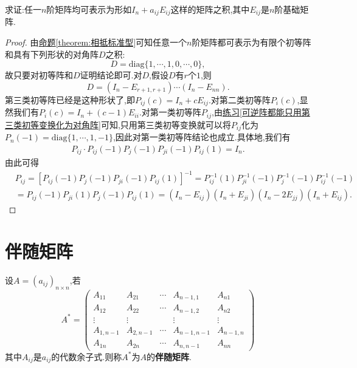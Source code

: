 \documentclass[lang=cn,newtx,10pt,scheme=chinese]{elegantbook}
\begin{document}
\begin{exercise}
求证:任一\(n\)阶矩阵均可表示为形如\(I_n + a_{ij}E_{ij}\)这样的矩阵之积,其中\(E_{ij}\)是\(n\)阶基础矩阵.
\end{exercise}
\begin{proof}
由\hyperref[theorem:相抵标准型]{命题\ref{theorem:相抵标准型}}可知任意一个\(n\)阶矩阵都可表示为有限个初等阵和具有下列形状的对角阵\(D\)之积:
\[
D = \mathrm{diag}\{1,\cdots,1,0,\cdots,0\},
\]
故只要对初等阵和\(D\)证明结论即可.对\(D\),假设\(D\)有\(r\)个\(1\),则
\[
D = (I_n - E_{r + 1,r + 1})\cdots(I_n - E_{nn}).
\]
第三类初等阵已经是这种形状了,即$P_{ij}\left( c \right) =I_n+cE_{ij}$.对第二类初等阵\(P_i(c)\),显然我们有\(P_i(c) = I_n + (c - 1)E_{ii}\).对第一类初等阵\(P_{ij}\),由\hyperref[可逆阵都能只用第三类初等变换化为对角阵]{练习\ref{可逆阵都能只用第三类初等变换化为对角阵}}可知,只用第三类初等变换就可以将\(P_{ij}\)化为\(P_n(-1) = \mathrm{diag}\{1,\cdots,1,-1\}\),因此对第一类初等阵结论也成立.具体地,我们有
\begin{align*}
P_{ij}\cdot P_{ij}\left( -1 \right) P_j\left( -1 \right) P_{ji}\left( -1 \right) P_{ij}\left( 1 \right) =I_n. 
\end{align*}
由此可得
\begin{align*}
&P_{ij}=\left[ P_{ij}\left( -1 \right) P_j\left( -1 \right) P_{ji}\left( -1 \right) P_{ij}\left( 1 \right) \right] ^{-1}=P_{ij}^{-1}\left( 1 \right) P_{ji}^{-1}\left( -1 \right) P_{j}^{-1}\left( -1 \right) P_{ij}^{-1}\left( -1 \right) 
\\
&=P_{ij}\left( -1 \right) P_{ji}\left( 1 \right) P_j\left( -1 \right) P_{ij}\left( 1 \right) =\left( I_n-E_{ij} \right) \left( I_n+E_{ji} \right) \left( I_n-2E_{jj} \right) \left( I_n+E_{ij} \right) .
\end{align*}
\end{proof}


\section{伴随矩阵}

\begin{definition}[伴随矩阵定义]\label{definition:伴随矩阵定义}
设$A=(a_{ij})_{n\times n}$,若
\[
A^* = 
\begin{pmatrix}
A_{11} & A_{21} & \cdots & A_{n - 1,1} & A_{n1} \\
A_{12} & A_{22} & \cdots & A_{n - 1,2} & A_{n2} \\
\vdots & \vdots & & \vdots & \vdots \\
A_{1,n - 1} & A_{2,n - 1} & \cdots & A_{n - 1,n - 1} & A_{n - 1,n} \\
A_{1n} & A_{2n} & \cdots & A_{n,n - 1} & A_{nn}
\end{pmatrix}
\]
其中\(A_{ij}\)是\(a_{ij}\)的代数余子式.则称\(A^*\)为\(A\)的\textbf{伴随矩阵}.
\end{definition}
\end{document}
